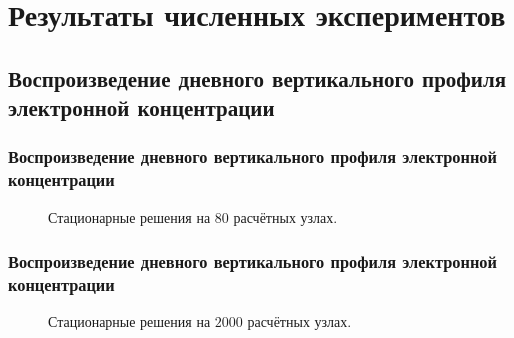 \documentclass[9pt, apectratio=43,unicode]{beamer}
\begin{document}
\section{Результаты численных экспериментов}
\subsection{Воспроизведение дневного вертикального профиля электронной концентрации}
\begin{frame}\frametitle{Воспроизведение дневного вертикального профиля электронной концентрации}

\begin{figure}[H]
\caption{Стационарные решения на $80$ расчётных узлах.}
\end{figure}
\end{frame}

\begin{frame}\frametitle{Воспроизведение дневного вертикального профиля электронной концентрации}
\begin{figure}[H]
\caption{Стационарные решения на $2000$ расчётных узлах.}
\end{figure}
\end{frame}
\end{document}
